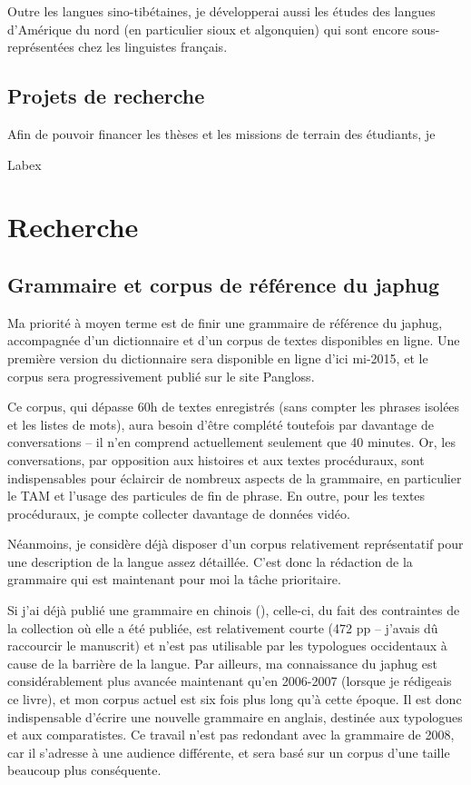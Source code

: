 \documentclass[oldfontcommands,oneside,a4paper,11pt]{article}
\begin{document}
Outre les langues sino-tibétaines, je développerai aussi les études des langues d'Amérique du nord (en particulier sioux et algonquien) qui sont encore sous-représentées chez les linguistes français.

\subsection{Projets de recherche}
Afin de pouvoir financer les thèses et les missions de terrain des étudiants, je 

Labex 

\section{Recherche}
\subsection{Grammaire et corpus de référence du japhug}
Ma priorité à moyen terme est de finir une grammaire de référence du japhug, accompagnée d'un dictionnaire et d'un corpus de textes disponibles en ligne. Une première version du dictionnaire sera disponible en ligne d'ici mi-2015, et le corpus sera progressivement publié sur le site Pangloss. 

Ce corpus, qui dépasse 60h de textes enregistrés (sans compter les phrases isolées et les listes de mots), aura besoin d'être complété toutefois par davantage de conversations -- il n'en comprend actuellement seulement que 40 minutes. Or, les conversations, par opposition aux histoires et aux textes procéduraux, sont indispensables pour éclaircir de nombreux aspects de la grammaire, en particulier le TAM et l'usage des particules de fin de phrase. En outre, pour les textes procéduraux, je compte collecter davantage de données vidéo. 

Néanmoins, je considère déjà disposer d'un corpus relativement représentatif pour une description de la langue assez détaillée. C'est donc la rédaction de la grammaire qui est maintenant pour moi la tâche prioritaire.



Si j'ai déjà publié une grammaire en chinois (\citealt{jacques08zh}), celle-ci, du fait des contraintes de la collection où elle a été publiée, est relativement courte (472 pp -- j'avais dû raccourcir le manuscrit) et n'est pas utilisable par les typologues occidentaux à cause de la barrière de la langue. Par ailleurs, ma connaissance du japhug est considérablement plus avancée maintenant qu'en 2006-2007 (lorsque je rédigeais ce livre), et mon corpus actuel est six fois plus long qu'à cette époque. Il est donc indispensable d'écrire une nouvelle grammaire en anglais, destinée aux typologues et aux comparatistes.  Ce travail n'est pas redondant avec la grammaire de 2008, car il s'adresse à une audience différente, et sera basé sur un corpus d'une taille beaucoup plus conséquente.
\end{document}

